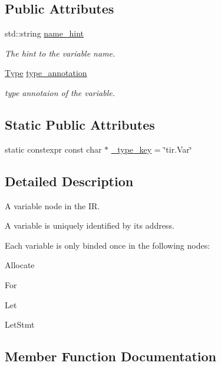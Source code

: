 \subsection*{Public Attributes}
\begin{DoxyCompactItemize}
\item 
std\+::string \hyperlink{classtvm_1_1tir_1_1VarNode_ac09a97d7c89f6d50b2a8f198e0917dce}{name\+\_\+hint}
\begin{DoxyCompactList}\small\item\em The hint to the variable name. \end{DoxyCompactList}\item 
\hyperlink{classtvm_1_1Type}{Type} \hyperlink{classtvm_1_1tir_1_1VarNode_a7a84c6d137a79e9a5b9c4b6183f18353}{type\+\_\+annotation}
\begin{DoxyCompactList}\small\item\em type annotaion of the variable. \end{DoxyCompactList}\end{DoxyCompactItemize}
\subsection*{Static Public Attributes}
\begin{DoxyCompactItemize}
\item 
static constexpr const char $\ast$ \hyperlink{classtvm_1_1tir_1_1VarNode_a43c00470f63021c090059d75086ec512}{\+\_\+type\+\_\+key} = \char`\"{}tir.\+Var\char`\"{}
\end{DoxyCompactItemize}


\subsection{Detailed Description}
A variable node in the IR. 

A variable is uniquely identified by its address.

Each variable is only binded once in the following nodes\+:
\begin{DoxyItemize}
\item Allocate
\item For
\item Let
\item Let\+Stmt 
\end{DoxyItemize}

\subsection{Member Function Documentation}
